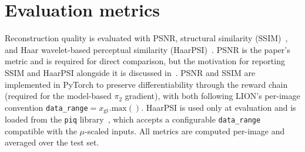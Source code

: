 \section{Evaluation metrics}
\label{sec:metrics}
Reconstruction quality is evaluated with PSNR, structural similarity (SSIM)~\citep{Wang2004SSIM}, and Haar wavelet-based perceptual similarity (HaarPSI)~\citep{Reisenhofer2018HaarPSI}. PSNR is the paper's metric and is required for direct comparison, but the motivation for reporting SSIM and HaarPSI alongside it is discussed in~. PSNR and SSIM are implemented in PyTorch to preserve differentiability through the reward chain (required for the model-based $\pi_2$ gradient), with both following LION's per-image convention \texttt{data\_range}$= x_{\text{gt}}.\text{max}()$. HaarPSI is used only at evaluation and is loaded from the \texttt{piq} library~\citep{Kastryulin2022PIQ}, which accepts a configurable \texttt{data\_range} compatible with the $\mu$-scaled inputs. All metrics are computed per-image and averaged over the test set.

